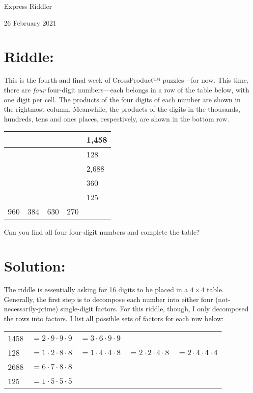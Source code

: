 \documentclass{article}
\begin{document}
\pagestyle{empty} %

\begin{center}
{\LARGE Express Riddler}

\vspace{0.15in}

{\Large 26 February 2021}
\end{center}


\section*{Riddle:}

This is the fourth and final week of CrossProduct™ puzzles---for now.
This time, there are \textit{four} four-digit numbers---each belongs in a row of the table below, with one digit per cell.
The products of the four digits of each number are shown in the rightmost column.
Meanwhile, the products of the digits in the thousands, hundreds, tens and ones places, respectively, are shown in the bottom row.

\begin{center}
\begin{tabular}{|C{0.7in}|C{0.7in}|C{0.7in}|C{0.7in}!{\vrule width 2pt}R{0.7in}|}
\hline
 & & & & 1,458 \\
\hline
 & & & & 128 \\
\hline
 & & & & 2,688 \\
\hline
 & & & & 360 \\
\hline
 & & & & 125 \\
960 & 384 & 630 & 270 & \\
\hline
\end{tabular}
\end{center}

Can you find all four four-digit numbers and complete the table?

\section*{Solution:}

The riddle is essentially asking for 16 digits to be placed in a $4\times4$ table.
Generally, the first step is to decompose each number into either four (not-necessarily-prime) single-digit factors.
For this riddle, though, I only decomposed the rows into factors.
I list all possible sets of factors for each row below:

\begin{center}
\setlength{\tabcolsep}{3pt}
\begin{tabular}{lllll}
1458 & $=2\cdot9\cdot9\cdot9$ & $=3\cdot6\cdot9\cdot9$ \\
128  & $=1\cdot2\cdot8\cdot8$ & $=1\cdot4\cdot4\cdot8$ & $=2\cdot2\cdot4\cdot8$ & $=2\cdot4\cdot4\cdot4$ \\
2688 & $=6\cdot7\cdot8\cdot8$ \\
125  & $=1\cdot5\cdot5\cdot5$
\end{tabular}
\end{center}
\end{document}
